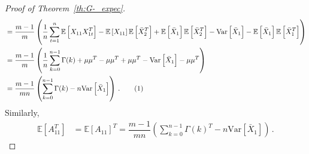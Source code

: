 \documentclass[11pt]{article}
\newcommand\numberthis{\addtocounter{equation}{1}\tag{\theequation}}
\theoremstyle{remark}
\begin{document}
\begin{proof}[Proof of Theorem~\ref{th:G-_expec}]
\begin{align*}
    &= \dfrac{m-1}{m}\left(\dfrac{1}{n}\sum_{t=1}^{n}\mathbb{E} \left[X_{11}X_{1t}^T \right] - \mathbb{E}\left[X_{11}\right] \mathbb{E}\left[\bar{X}_2^T \right] + \mathbb{E} \left[\bar{X}_1\right]\mathbb{E}\left[\bar{X}_2^T\right] - \text{Var}\left[\bar{X}_1 \right] - \mathbb{E}\left[\bar{X}_1 \right]\mathbb{E}\left[\bar{X}_1^T \right]\right)\\
    &= \dfrac{m-1}{m}\left(\dfrac{1}{n}\sum_{k=0}^{n-1}\Gamma(k) + \mu \mu^T - \mu \mu^T + \mu \mu^T - \text{Var}\left[\bar{X}_1 \right] - \mu \mu^T\right)\\
    &= \dfrac{m-1}{mn}\left(\sum_{k=0}^{n-1}\Gamma(k) - n\text{Var}\left[\bar{X}_1 \right]\right)\,. \numberthis \label{eq:acf_2}
\end{align*}
%
Similarly,
%    
\begin{align}
\label{eq:acf_3}
    \mathbb{E} \left[ A_{11}^T \right] &= \mathbb{E}\left[ A_{11}\right]^T = \dfrac{m-1}{mn}\left(\sum_{k=0}^{n-1}\Gamma(k)^T - n\text{Var}\left[\bar{X}_1 \right] \right)\,.
\end{align}



\end{proof}
\end{document}

